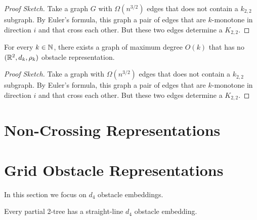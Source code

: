 \documentclass{patmorin}
\begin{document}
\begin{proof}[Proof Sketch]
   Take a graph $G$ with $\Omega(n^{3/2})$ edges that does not contain a
   $k_{2,2}$ subgraph.  By Euler's formula, this graph a pair of edges
   that are $k$-monotone in direction $i$ and that cross each other. But
   these two edges determine a $K_{2,2}$.
\end{proof}

\begin{thm}
  For every $k\in \mathbb{N}$, there exists a graph of maximum degree $O(k)$
  that has no $(\mathbb{R}^2,d_k,\rho_k)$ obstacle representation.
\end{thm}

\begin{proof}[Proof Sketch]
   Take a graph with $\Omega(n^{3/2})$ edges that does not contain a
   $k_{2,2}$ subgraph. By Euler's formula, this graph a pair of edges
   that are $k$-monotone in direction $i$ and that cross each other. But
   these two edges determine a $K_{2,2}$.
\end{proof}



\section{Non-Crossing Representations}

\section{Grid Obstacle Representations}

In this section we focus on $d_4$ obstacle embeddings.

\begin{thm}
  Every partial 2-tree has a straight-line $d_4$ obstacle embedding.
\end{thm}
\end{document}
